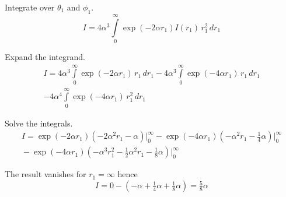 \documentclass[12pt]{article}
\begin{document}
\noindent
Integrate over $\theta_1$ and $\phi_1$.
\begin{equation*}
I=4\alpha^3\int\limits_0^\infty
\exp(-2\alpha r_1)I(r_1)\,r_1^2\,dr_1
\end{equation*}

\noindent
Expand the integrand.
\begin{multline*}
I=4\alpha^3\int\limits_0^\infty\exp(-2\alpha r_1)\,r_1\,dr_1
-4\alpha^3\int\limits_0^\infty\exp(-4\alpha r_1)\,r_1\,dr_1
\\
-4\alpha^4\int\limits_0^\infty\exp(-4\alpha r_1)\,r_1^2\,dr_1
\end{multline*}

\noindent
Solve the integrals.
\begin{multline*}
I=\exp(-2\alpha r_1)\left(-2\alpha^2r_1-\alpha\right)\bigg|_0^\infty
-\exp(-4\alpha r_1)\left(-\alpha^2r_1-\tfrac{1}{4}\alpha\right)\bigg|_0^\infty
\\
{}-\exp(-4\alpha r_1)\left(-\alpha^3r_1^2-\tfrac{1}{2}\alpha^2r_1-\tfrac{1}{8}\alpha\right)\bigg|_0^\infty
\end{multline*}

\noindent
The result vanishes for $r_1=\infty$ hence
\begin{equation*}
I=0-\left(-\alpha+\tfrac{1}{4}\alpha+\tfrac{1}{8}\alpha\right)=\tfrac{5}{8}\alpha
\tag{7}
\end{equation*}
\end{document}
